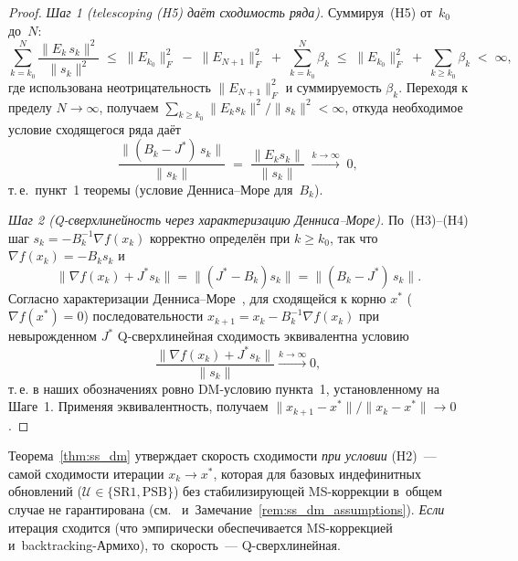 \begin{proof}
\textit{Шаг 1 (telescoping (H5) даёт сходимость ряда).}
Суммируя~(H5) от~$k_0$ до~$N$:
\[
  \sum_{k=k_0}^{N} \frac{\|E_k\, s_k\|^2}{\|s_k\|^2}
  \;\le\; \|E_{k_0}\|_F^2 \;-\; \|E_{N+1}\|_F^2
       \;+\; \sum_{k=k_0}^{N}\beta_k
  \;\le\; \|E_{k_0}\|_F^2 \;+\; \sum_{k\ge k_0}\beta_k
  \;<\;\infty,
\]
где использована неотрицательность $\|E_{N+1}\|_F^2$ и
суммируемость $\beta_k$. Переходя к пределу $N\to\infty$,
получаем $\sum_{k\ge k_0}\|E_k s_k\|^2/\|s_k\|^2 < \infty$, откуда
необходимое условие сходящегося ряда даёт
\begin{equation}\label{eq:ss_dm_bk}
  \frac{\|(B_k - J^*)\,s_k\|}{\|s_k\|}
  \;=\; \frac{\|E_k s_k\|}{\|s_k\|} \;\xrightarrow{k\to\infty}\; 0,
\end{equation}
т.\,е.\ пункт~1 теоремы (условие Денниса--Море для~$B_k$).

\textit{Шаг 2 (Q-сверхлинейность через характеризацию Денниса--Море).}
По~(H3)--(H4) шаг $s_k = -B_k^{-1}\nabla f(x_k)$ корректно определён при $k \ge k_0$,
так что $\nabla f(x_k) = -B_k s_k$ и
\[
  \|\nabla f(x_k) + J^* s_k\|
  = \|(J^* - B_k) s_k\|
  = \|(B_k - J^*)\, s_k\|.
\]
Согласно характеризации Денниса--Море~\cite[Th.~2.2]{dennis1974},
для сходящейся к корню $x^*$ ($\nabla f(x^*) = 0$) последовательности
$x_{k+1} = x_k - B_k^{-1}\nabla f(x_k)$ при невырожденном $J^*$ Q-сверхлинейная
сходимость эквивалентна условию
\[
  \frac{\|\nabla f(x_k) + J^* s_k\|}{\|s_k\|} \xrightarrow{k\to\infty} 0,
\]
т.\,е. в наших обозначениях ровно DM-условию пункта~1, установленному
на Шаге~1. Применяя эквивалентность, получаем
$\|x_{k+1} - x^*\|/\|x_k - x^*\| \to 0$.
\end{proof}

\begin{remark}\label{rem:ss_dm_role}
Теорема~\ref{thm:ss_dm} утверждает скорость сходимости \emph{при условии} (H2)~---
самой сходимости итерации $x_k\to x^*$, которая для базовых индефинитных
обновлений ($\mathcal{U}\in\{\mathrm{SR1},\mathrm{PSB}\}$) без
стабилизирующей MS-коррекции в~общем случае не гарантирована
(см.~\cite{conn1991} и~Замечание~\ref{rem:ss_dm_assumptions}).
\emph{Если} итерация сходится (что эмпирически обеспечивается MS-коррекцией
и~backtracking-Армихо), то~скорость~--- Q-сверхлинейная.
\end{remark}

